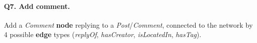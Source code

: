 \paragraph{\textbf{Q7}. Add comment.}
Add a \emph{Comment} \textbf{node} replying to a
\emph{Post}/\emph{Comment}, connected to the network by 4 possible
\textbf{edge} types (\emph{replyOf}, \emph{hasCreator},
\emph{isLocatedIn}, \emph{hasTag}).
